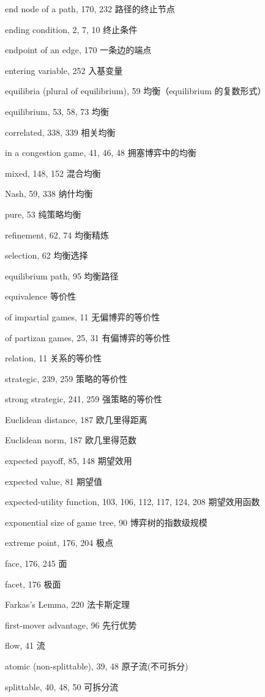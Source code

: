 end node of a path, 170, 232 路径的终止节点

ending condition, 2, 7, 10 终止条件

endpoint of an edge, 170 一条边的端点

entering variable, 252 入基变量

equilibria (plural of equilibrium), 59 均衡（equilibrium 的复数形式）

equilibrium, 53, 58, 73 均衡

\qquad correlated, 338, 339 相关均衡

\qquad in a congestion game, 41, 46, 48 拥塞博弈中的均衡

\qquad mixed, 148, 152 混合均衡

\qquad Nash, 59, 338 纳什均衡

\qquad pure, 53 纯策略均衡

\qquad refinement, 62, 74 均衡精炼

\qquad selection, 62 均衡选择

equilibrium path, 95 均衡路径

equivalence 等价性

\qquad  of impartial games, 11 无偏博弈的等价性

\qquad  of partizan games, 25, 31 有偏博弈的等价性

\qquad  relation, 11 关系的等价性

\qquad  strategic, 239, 259 策略的等价性

\qquad  strong strategic, 241, 259 强策略的等价性

Euclidean distance, 187 欧几里得距离

Euclidean norm, 187 欧几里得范数

expected payoff, 85, 148 期望效用

expected value, 81 期望值

expected-utility function, 103, 106, 112, 117, 124, 208 期望效用函数

exponential size of game tree, 90 博弈树的指数级规模

extreme point, 176, 204 极点

face, 176, 245 面

facet, 176 {\color{blue} 极面}

Farkas’s Lemma, 220 法卡斯定理

first-mover advantage, 96 先行优势

flow, 41 流

\qquad   atomic (non-splittable), 39, 48 原子流(不可拆分)

\qquad   splittable, 40, 48, 50 可拆分流

